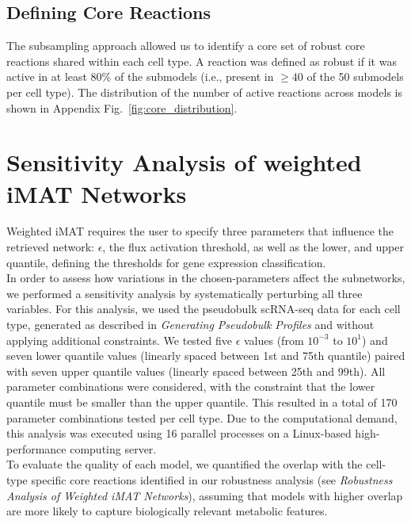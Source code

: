 \subsection{Defining Core Reactions}
The subsampling approach allowed us to identify a core set of robust core reactions shared within each cell type. A reaction was defined as robust if it was active in at least 80\%
of the submodels (i.e., present in $\ge40$ of the 50 submodels per cell type). The distribution of the number of active reactions across models is shown in Appendix Fig.~\ref{fig:core_distribution}.


\section{Sensitivity Analysis of weighted iMAT Networks}
Weighted iMAT requires the user to specify three parameters that influence the retrieved network: $\epsilon$,
the flux activation threshold, as well as the lower, and upper quantile, defining the thresholds for gene expression classification. 
\\

In order to assess how variations in the chosen-parameters affect the subnetworks, we performed a sensitivity analysis by systematically perturbing all three variables. For this analysis, we used the pseudobulk scRNA-seq data for each cell type, generated as described in \textit{Generating Pseudobulk Profiles}
and without applying additional constraints. We tested five $\epsilon$ values (from $10^{-3}$ to $10^{1}$) and seven lower quantile values (linearly spaced between 1st  and 75th quantile) paired with seven upper quantile values (linearly spaced between 25th and 99th). All parameter combinations were considered, with the constraint that the lower quantile must be smaller than the upper quantile. This resulted in a total of 170 parameter combinations tested per cell type. Due to the computational demand, this analysis was executed using 16 parallel processes on a Linux-based high-performance computing server. 
\\

To evaluate the quality of each model, we quantified the overlap with the cell-type specific core reactions identified in our robustness analysis (see \textit{Robustness Analysis of Weighted iMAT Networks}), assuming that models with higher overlap are more likely to capture biologically relevant metabolic features. 




\endinput 